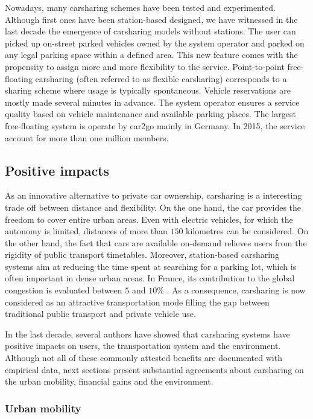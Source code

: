 Nowadays, many carsharing schemes have been tested and experimented.
Although first ones have been station-based designed, we have witnessed in the last decade the emergence of carsharing models without stations.
The user can picked up on-street parked vehicles owned by the system operator and parked on any legal parking space within a defined area.
This new feature comes with the propensity to assign more and more flexibility to the service.
Point-to-point free-floating carsharing (often referred to as flexible carsharing) corresponds to a sharing scheme where usage is typically spontaneous.
Vehicle reservations are mostly made several minutes in advance.
The system operator ensures a service quality based on vehicle maintenance and available parking places.
The largest free-floating system is operate by car2go mainly in Germany.
In 2015, the service account for more than one million members.

\subsection{Positive impacts}
As an innovative alternative to private car ownership, carsharing is a interesting trade off between distance and flexibility.
On the one hand, the car provides the freedom to cover entire urban areas.
Even with electric vehicles, for which the autonomy is limited, distances of more than $150$ kilometres can be considered.
On the other hand, the fact that cars are available on-demand relieves users from the rigidity of public transport timetables.
Moreover, station-based carsharing systems aim at reducing the time spent at searching for a parking lot, which is often important in dense urban areas.
In France, its contribution to the global congestion is evaluated between $5$ and $10$\%  \cite{stationnement_intelligent_cerema}.
As a consequence, carsharing is now considered as an attractive transportation mode filling the gap between traditional public transport and private vehicle use.

\medskip
In the last decade, several authors have showed that carsharing systems have positive impacts on users, the transportation system and the environment.
Although not all of these commonly attested benefits are documented with empirical data, next sections present substantial agreements about carsharing on the urban mobility, financial gains and the environment.


\subsubsection{Urban mobility}\label{urbanMobility}

